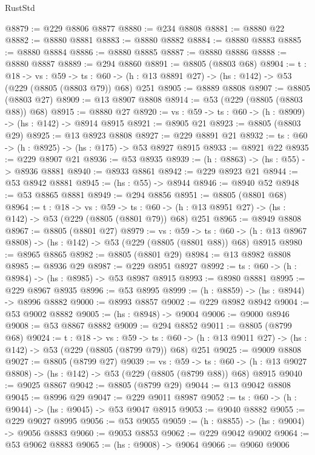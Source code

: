 \begin{lexlean}{RustStd}
\begin{coremodule}
@8879 := @229 @8806 @8877
@8880 := @234 @8808
@8881 := @8880 @22
@8882 := @8880 @8881
@8883 := @8880 @8882
@8884 := @8880 @8883
@8885 := @8880 @8884
@8886 := @8880 @8885
@8887 := @8880 @8886
@8888 := @8880 @8887
@8889 := @294 @8860
@8891 := @8805 (@8803 @68)
@8904 := {t : @18} ->
  {vs : @59} ->
  {ts : @60} -> (h : @13 @8891 @27) -> (hs : @142) -> @53 (@229 (@8805 (@8803 @79)) @68) @251
@8905 := @8889 @8808
@8907 := @8805 (@8803 @27)
@8909 := @13 @8907 @8808
@8914 := @53 (@229 (@8805 (@8803 @88)) @68)
@8915 := @8880 @27
@8920 := {vs : @59} -> {ts : @60} -> (h : @8909) -> (hs : @142) -> @8914 @8915
@8921 := @8905 @21
@8923 := @8805 (@8803 @29)
@8925 := @13 @8923 @8808
@8927 := @229 @8891 @21
@8932 := {ts : @60} -> (h : @8925) -> (hs : @175) -> @53 @8927 @8915
@8933 := @8921 @22
@8935 := @229 @8907 @21
@8936 := @53 @8935
@8939 := (h : @8863) -> (hs : @55) -> @8936 @8881
@8940 := @8933 @8861
@8942 := @229 @8923 @21
@8944 := @53 @8942 @8881
@8945 := (hs : @55) -> @8944
@8946 := @8940 @52
@8948 := @53 @8865 @8881
@8949 := @294 @8856
@8951 := @8805 (@8801 @68)
@8964 := {t : @18} ->
  {vs : @59} ->
  {ts : @60} -> (h : @13 @8951 @27) -> (hs : @142) -> @53 (@229 (@8805 (@8801 @79)) @68) @251
@8965 := @8949 @8808
@8967 := @8805 (@8801 @27)
@8979 := {vs : @59} ->
  {ts : @60} -> (h : @13 @8967 @8808) -> (hs : @142) -> @53 (@229 (@8805 (@8801 @88)) @68) @8915
@8980 := @8965 @8865
@8982 := @8805 (@8801 @29)
@8984 := @13 @8982 @8808
@8985 := @8936 @29
@8987 := @229 @8951 @8927
@8992 := {ts : @60} -> (h : @8984) -> (hs : @8985) -> @53 @8987 @8915
@8993 := @8980 @8881
@8995 := @229 @8967 @8935
@8996 := @53 @8995
@8999 := (h : @8859) -> (hs : @8944) -> @8996 @8882
@9000 := @8993 @8857
@9002 := @229 @8982 @8942
@9004 := @53 @9002 @8882
@9005 := (hs : @8948) -> @9004
@9006 := @9000 @8946
@9008 := @53 @8867 @8882
@9009 := @294 @8852
@9011 := @8805 (@8799 @68)
@9024 := {t : @18} ->
  {vs : @59} ->
  {ts : @60} -> (h : @13 @9011 @27) -> (hs : @142) -> @53 (@229 (@8805 (@8799 @79)) @68) @251
@9025 := @9009 @8808
@9027 := @8805 (@8799 @27)
@9039 := {vs : @59} ->
  {ts : @60} -> (h : @13 @9027 @8808) -> (hs : @142) -> @53 (@229 (@8805 (@8799 @88)) @68) @8915
@9040 := @9025 @8867
@9042 := @8805 (@8799 @29)
@9044 := @13 @9042 @8808
@9045 := @8996 @29
@9047 := @229 @9011 @8987
@9052 := {ts : @60} -> (h : @9044) -> (hs : @9045) -> @53 @9047 @8915
@9053 := @9040 @8882
@9055 := @229 @9027 @8995
@9056 := @53 @9055
@9059 := (h : @8855) -> (hs : @9004) -> @9056 @8883
@9060 := @9053 @8853
@9062 := @229 @9042 @9002
@9064 := @53 @9062 @8883
@9065 := (hs : @9008) -> @9064
@9066 := @9060 @9006

\end{coremodule}
\end{lexlean}
